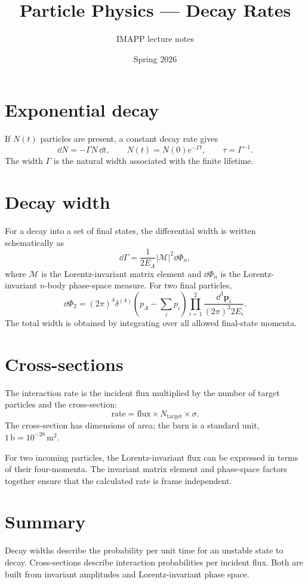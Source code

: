 \documentclass[11pt,a4paper]{article}
\title{Particle Physics --- Decay Rates}
\author{IMAPP lecture notes}
\date{Spring 2026}
\begin{document}
\maketitle

\section{Exponential decay}
If $N(t)$ particles are present, a constant decay rate gives
\[
\dd N=-\Gamma N\,\dd t,\qquad N(t)=N(0)e^{-\Gamma t},\qquad \tau=\Gamma^{-1}.
\]
The width $\Gamma$ is the natural width associated with the finite lifetime.

\section{Decay width}
For a decay into a set of final states, the differential width is written schematically as
\[
\dd\Gamma=\frac{1}{2E_A}|\mathcal M|^2\dd\Phi_n,
\]
where $\mathcal M$ is the Lorentz-invariant matrix element and $\dd\Phi_n$ is the Lorentz-invariant $n$-body phase-space measure. For two final particles,
\[
\dd\Phi_2=(2\pi)^4\delta^{(4)}\!\left(p_A-\sum_i p_i\right)
\prod_{i=1}^2\frac{\dd^3\mathbf p_i}{(2\pi)^3 2E_i}.
\]
The total width is obtained by integrating over all allowed final-state momenta.

\section{Cross-sections}
The interaction rate is the incident flux multiplied by the number of target particles and the cross-section:
\[
\text{rate}=\text{flux}\times N_{\text{target}}\times\sigma.
\]
The cross-section has dimensions of area; the barn is a standard unit, $1\,\mathrm{b}=10^{-28}\,\mathrm{m}^2$.

For two incoming particles, the Lorentz-invariant flux can be expressed in terms of their four-momenta. The invariant matrix element and phase-space factors together ensure that the calculated rate is frame independent.

\section*{Summary}
Decay widths describe the probability per unit time for an unstable state to decay. Cross-sections describe interaction probabilities per incident flux. Both are built from invariant amplitudes and Lorentz-invariant phase space.
\end{document}
